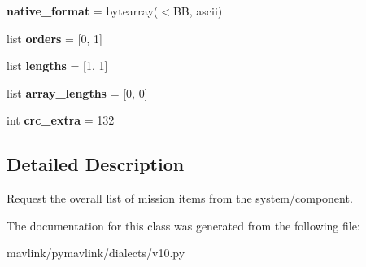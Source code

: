 \begin{DoxyCompactItemize}
{\bfseries native\+\_\+format} = bytearray(\textquotesingle{}$<$BB\textquotesingle{}, \textquotesingle{}ascii\textquotesingle{})
\item 
\mbox{\label{classpymavlink_1_1dialects_1_1v10_1_1MAVLink__mission__request__list__message_a703980c3c5b4157b5d0cb53030675813}} 
list {\bfseries orders} = \mbox{[}0, 1\mbox{]}
\item 
\mbox{\label{classpymavlink_1_1dialects_1_1v10_1_1MAVLink__mission__request__list__message_a60d3e005e43c950ee27e31fe78ea9054}} 
list {\bfseries lengths} = \mbox{[}1, 1\mbox{]}
\item 
\mbox{\label{classpymavlink_1_1dialects_1_1v10_1_1MAVLink__mission__request__list__message_a5f71771c5f96ed83a3dd561ba9cb1ca3}} 
list {\bfseries array\+\_\+lengths} = \mbox{[}0, 0\mbox{]}
\item 
\mbox{\label{classpymavlink_1_1dialects_1_1v10_1_1MAVLink__mission__request__list__message_a12e88f15271d9c9c1607f53fd23cae20}} 
int {\bfseries crc\+\_\+extra} = 132
\end{DoxyCompactItemize}


\subsection{Detailed Description}
\begin{DoxyVerb}Request the overall list of mission items from the
system/component.
\end{DoxyVerb}
 

The documentation for this class was generated from the following file\+:\begin{DoxyCompactItemize}
\item 
mavlink/pymavlink/dialects/v10.\+py\end{DoxyCompactItemize}
